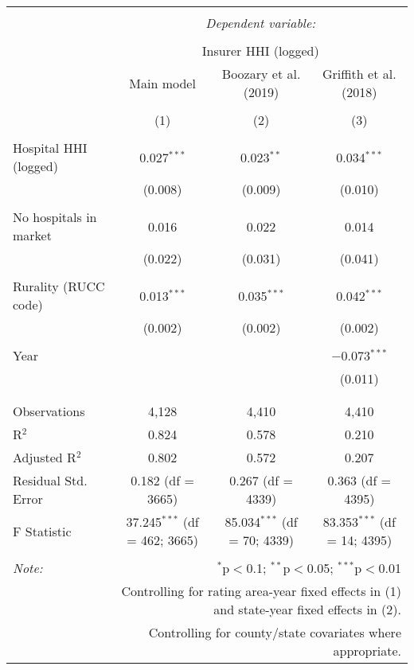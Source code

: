 
\begingroup 
\scriptsize 
\begin{tabular}{@{\extracolsep{5pt}}lccc} 
\\[-1.8ex]\hline 
\hline \\[-1.8ex] 
 & \multicolumn{3}{c}{\textit{Dependent variable:}} \\ 
\cline{2-4} 
\\[-1.8ex] & \multicolumn{3}{c}{Insurer HHI (logged)} \\ 
 & Main model & Boozary et al. (2019) & Griffith et al. (2018) \\ 
\\[-1.8ex] & (1) & (2) & (3)\\ 
\hline \\[-1.8ex] 
 Hospital HHI (logged) & 0.027$^{***}$ & 0.023$^{**}$ & 0.034$^{***}$ \\ 
  & (0.008) & (0.009) & (0.010) \\ 
  & & & \\ 
 No hospitals in market & 0.016 & 0.022 & 0.014 \\ 
  & (0.022) & (0.031) & (0.041) \\ 
  & & & \\ 
 Rurality (RUCC code) & 0.013$^{***}$ & 0.035$^{***}$ & 0.042$^{***}$ \\ 
  & (0.002) & (0.002) & (0.002) \\ 
  & & & \\ 
 Year &  &  & $-$0.073$^{***}$ \\ 
  &  &  & (0.011) \\ 
  & & & \\ 
\hline \\[-1.8ex] 
Observations & 4,128 & 4,410 & 4,410 \\ 
R$^{2}$ & 0.824 & 0.578 & 0.210 \\ 
Adjusted R$^{2}$ & 0.802 & 0.572 & 0.207 \\ 
Residual Std. Error & 0.182 (df = 3665) & 0.267 (df = 4339) & 0.363 (df = 4395) \\ 
F Statistic & 37.245$^{***}$ (df = 462; 3665) & 85.034$^{***}$ (df = 70; 4339) & 83.353$^{***}$ (df = 14; 4395) \\ 
\hline 
\hline \\[-1.8ex] 
\textit{Note:}  & \multicolumn{3}{r}{$^{*}$p$<$0.1; $^{**}$p$<$0.05; $^{***}$p$<$0.01} \\ 
 & \multicolumn{3}{r}{Controlling for rating area-year fixed effects in (1) and state-year fixed effects in (2).} \\ 
 & \multicolumn{3}{r}{Controlling for county/state covariates where appropriate.} \\ 
\end{tabular} 
\endgroup 
